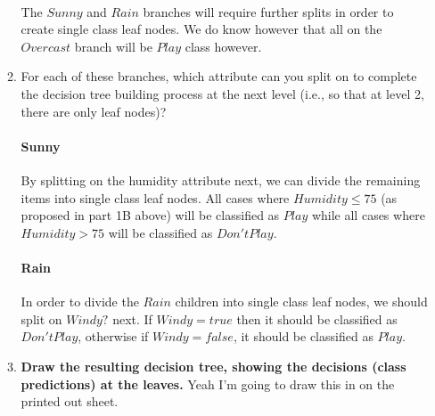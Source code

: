 \documentclass[12pt]{article}
\begin{document}
\begin{enumerate}
\begin{enumerate}
\paragraph{} The $Sunny$ and $Rain$ branches will require further splits in order to create single class leaf nodes. We do know however that all on the $Overcast$ branch will be $Play$ class however.
\item For each of these branches, which attribute can you split on to complete the decision tree building process at the next level (i.e., so that at level 2, there are only leaf nodes)?\\
\vspace{-2em}
\paragraph{Sunny} By splitting on the humidity attribute next, we can divide the remaining items into single class leaf nodes. All cases where $Humidity \leq 75$ (as proposed in part 1B above) will be classified as $Play$ while all cases where $Humidity > 75$ will be classified as $Don't Play$.

\paragraph{Rain} In order to divide the $Rain$ children into single class leaf nodes, we should split on $Windy?$ next. If $Windy = true$ then it should be classified as $Don't Play$, otherwise if $Windy = false$, it should be classified as $Play$.

\newpage
\item \textbf{Draw the resulting decision tree, showing the decisions (class predictions) at the leaves.} Yeah I'm going to draw this in on the printed out sheet.\\

\end{enumerate}

\end{enumerate}
\end{document}
